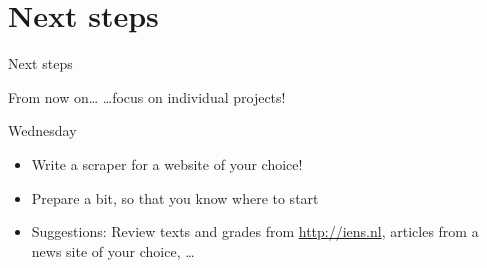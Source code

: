 \documentclass{beamer}
\begin{document}
\section{Next steps}
\begin{frame}
Next steps
\end{frame}




\begin{frame}{From now on\ldots}
\ldots focus on individual projects!
\end{frame}


\begin{frame}{Wednesday}
\begin{itemize}
\item Write a scraper for a website of your choice!
\item Prepare a bit, so that you know where to start
\item Suggestions: Review texts and grades from \url{http://iens.nl}, articles from a news site of your choice, \ldots
\end{itemize}
\end{frame}


\begin{frame}[plain]{}
\end{frame}
\end{document}
